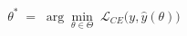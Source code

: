 \documentclass[preview]{standalone}
\begin{document}
\begin{align*}
\theta^* \;=\; \arg\!\min_{\theta \in \Theta}\; \mathcal{L}_{CE}\bigl(y,\hat y(\theta)\bigr)
\end{align*}
\end{document}
